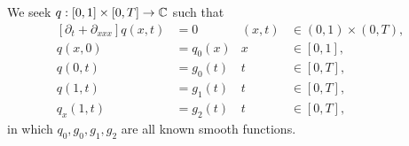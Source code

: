 We seek $q:[0,1]\times[0,T]\to\mathbb C$ such that
\begin{subequations} \label{eqn:Problem}
\begin{align}
    \label{eqn:Problem.PDE}
    [\partial_t+\partial_{xxx}]q(x,t) &= 0 & (x,t) &\in (0,1)\times(0,T), \\
    \label{eqn:Problem.IC}
    q(x,0) &= q_0(x) & x &\in[0,1], \\
    \label{eqn:Problem.BC0}
    q(0,t) &= g_0(t) & t &\in [0,T], \\
    \label{eqn:Problem.BC1}
    q(1,t) &= g_1(t) & t &\in [0,T], \\
    \label{eqn:Problem.BC2}
    q_x(1,t) &= g_2(t) & t &\in [0,T],
\end{align}
\end{subequations}
in which $q_0,g_0,g_1,g_2$ are all known smooth functions.
